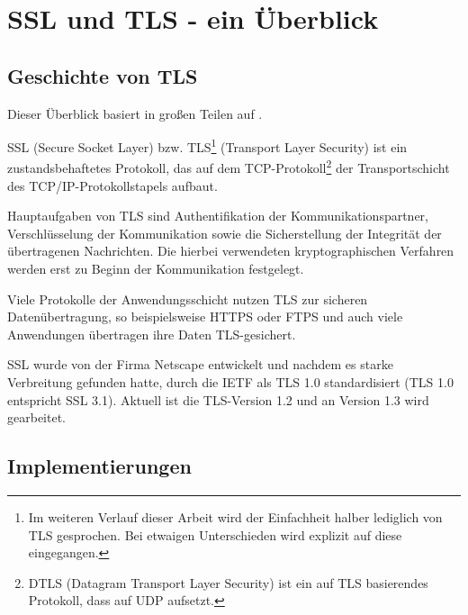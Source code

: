 \chapter{SSL und TLS - ein Überblick}

\section{Geschichte von TLS}

Dieser Überblick basiert in großen Teilen auf \cite{schmeh09}.

SSL (Secure Socket Layer) bzw. TLS\footnote{Im weiteren Verlauf dieser Arbeit wird der Einfachheit halber lediglich von TLS gesprochen. Bei etwaigen Unterschieden wird explizit auf diese eingegangen.} (Transport Layer Security) ist ein zustandsbehaftetes Protokoll, das auf dem TCP-Protokoll\footnote{DTLS (Datagram Transport Layer Security) ist ein auf TLS basierendes Protokoll, dass auf UDP aufsetzt.} der Transportschicht des TCP/IP-Protokollstapels aufbaut. 

Hauptaufgaben von TLS sind Authentifikation der Kommunikationspartner, Verschlüsselung der Kommunikation sowie die Sicherstellung der Integrität der übertragenen Nachrichten. Die hierbei verwendeten kryptographischen Verfahren werden erst zu Beginn der Kommunikation festgelegt. 

Viele Protokolle der Anwendungsschicht nutzen TLS zur sicheren Datenübertragung, so beispielsweise HTTPS oder FTPS und auch viele Anwendungen übertragen ihre Daten TLS-gesichert.

SSL wurde von der Firma Netscape entwickelt und nachdem es starke Verbreitung gefunden hatte, durch die IETF als TLS 1.0 standardisiert (TLS 1.0 entspricht SSL 3.1). Aktuell ist die TLS-Version 1.2 und an Version 1.3 wird gearbeitet.


\section{Implementierungen}

